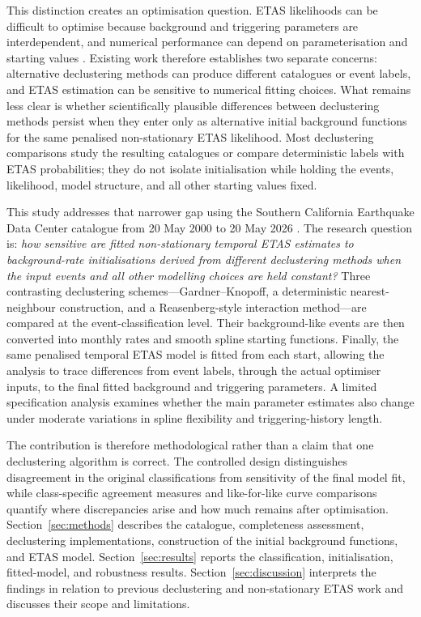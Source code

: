 This distinction creates an optimisation question. ETAS likelihoods can be
difficult to optimise because background and triggering parameters are
interdependent, and numerical performance can depend on parameterisation and
starting values \citep{veen2008estimation,lombardi2015simulated}. Existing
work therefore establishes two separate concerns: alternative declustering
methods can produce different catalogues or event labels, and ETAS estimation
can be sensitive to numerical fitting choices. What remains less clear is
whether scientifically plausible differences between declustering methods
persist when they enter only as alternative initial background functions for
the same penalised non-stationary ETAS likelihood. Most declustering
comparisons study the resulting catalogues or compare deterministic labels
with ETAS probabilities; they do not isolate initialisation while holding the
events, likelihood, model structure, and all other starting values fixed.

This study addresses that narrower gap using the Southern California
Earthquake Data Center catalogue from 20 May 2000 to 20 May 2026
\citep{scedc2013,scedc_catalog_search2026}. The research question is: \emph{how
sensitive are fitted non-stationary temporal ETAS estimates to background-rate
initialisations derived from different declustering methods when the input
events and all other modelling choices are held constant?} Three contrasting
declustering schemes---Gardner--Knopoff, a deterministic nearest-neighbour
construction, and a Reasenberg-style interaction method---are compared at the
event-classification level. Their background-like events are then converted
into monthly rates and smooth spline starting functions. Finally, the same
penalised temporal ETAS model is fitted from each start, allowing the analysis
to trace differences from event labels, through the actual optimiser inputs,
to the final fitted background and triggering parameters. A limited
specification analysis examines whether the main parameter estimates also
change under moderate variations in spline flexibility and triggering-history
length.

The contribution is therefore methodological rather than a claim that one
declustering algorithm is correct. The controlled design distinguishes
disagreement in the original classifications from sensitivity of the final
model fit, while class-specific agreement measures and like-for-like curve
comparisons quantify where discrepancies arise and how much remains after
optimisation. Section~\ref{sec:methods} describes the catalogue,
completeness assessment, declustering implementations, construction of the
initial background functions, and ETAS model. Section~\ref{sec:results}
reports the classification, initialisation, fitted-model, and robustness
results. Section~\ref{sec:discussion} interprets the findings in relation to
previous declustering and non-stationary ETAS work and discusses their scope
and limitations.
